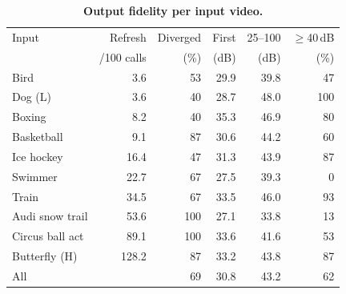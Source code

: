 \begin{table}[t]
  \centering
  \small
  \caption{\textbf{Output fidelity per input video.}}
  \label{tab:fidelity}
  \setlength{\tabcolsep}{3pt}
  \begin{tabular*}{\columnwidth}{@{\extracolsep{\fill}}lrrrrr@{}}
    \toprule
    Input & Refresh & Diverged & First & 25--100 & $\geq$40\,dB \\
          & /100 calls & (\%) & (dB) & (dB) & (\%) \\
    \midrule
    Bird & 3.6 & 53 & 29.9 & 39.8 & 47 \\
    Dog (L) & 3.6 & 40 & 28.7 & 48.0 & 100 \\
    Boxing & 8.2 & 40 & 35.3 & 46.9 & 80 \\
    Basketball & 9.1 & 87 & 30.6 & 44.2 & 60 \\
    Ice hockey & 16.4 & 47 & 31.3 & 43.9 & 87 \\
    Swimmer & 22.7 & 67 & 27.5 & 39.3 & 0 \\
    Train & 34.5 & 67 & 33.5 & 46.0 & 93 \\
    Audi snow trail & 53.6 & 100 & 27.1 & 33.8 & 13 \\
    Circus ball act & 89.1 & 100 & 33.6 & 41.6 & 53 \\
    Butterfly (H) & 128.2 & 87 & 33.2 & 43.8 & 87 \\
    \midrule
    All & & 69 & 30.8 & 43.2 & 62 \\
    \bottomrule
  \end{tabular*}
\end{table}

